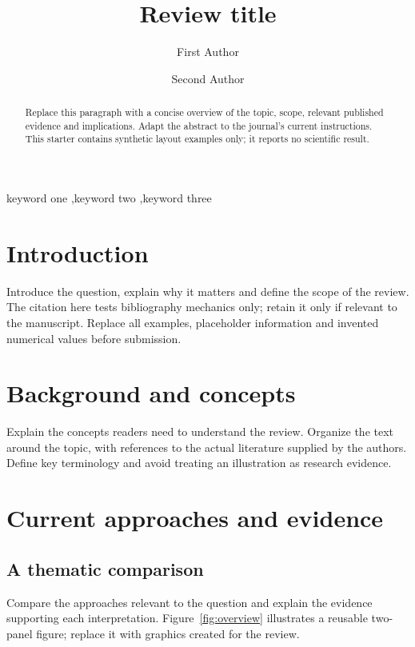 \documentclass[review,12pt]{elsarticle}
\begin{document}
\begin{frontmatter}
\title{Review title}
\author[inst1]{First Author}
\author[inst1,inst2]{Second Author\texorpdfstring{}{}}
\address[inst1]{Department, First Institution, City, Country}
\address[inst2]{Department, Second Institution, City, Country}

\begin{abstract}
Replace this paragraph with a concise overview of the topic, scope, relevant
published evidence and implications. Adapt the abstract to the journal's
current instructions. This starter contains synthetic layout examples only;
it reports no scientific result.
\end{abstract}
\begin{keyword}
keyword one \sep keyword two \sep keyword three
\end{keyword}
\end{frontmatter}

\section{Introduction}\label{sec:introduction}
Introduce the question, explain why it matters and define the scope of the
review. The citation here tests bibliography mechanics only; retain it only
if relevant to the manuscript\cite{wilkinson2016fair}. Replace all examples,
placeholder information and invented numerical values before submission.

\section{Background and concepts}\label{sec:background}
Explain the concepts readers need to understand the review. Organize the
text around the topic, with references to the actual literature supplied by
the authors. Define key terminology and avoid treating an illustration as
research evidence.

\section{Current approaches and evidence}\label{sec:evidence}
\subsection{A thematic comparison}
Compare the approaches relevant to the question and explain the evidence
supporting each interpretation. Figure~\ref{fig:overview} illustrates a
reusable two-panel figure; replace it with graphics created for the review.
\end{document}
